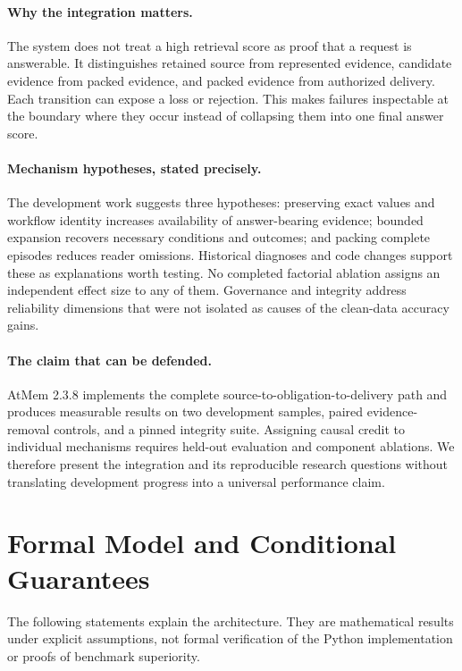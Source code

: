 \documentclass[11pt]{article}
\begin{document}
\paragraph{Why the integration matters.}
The system does not treat a high retrieval score as proof that a request is answerable. It distinguishes retained source from represented evidence, candidate evidence from packed evidence, and packed evidence from authorized delivery. Each transition can expose a loss or rejection. This makes failures inspectable at the boundary where they occur instead of collapsing them into one final answer score.

\paragraph{Mechanism hypotheses, stated precisely.}
The development work suggests three hypotheses: preserving exact values and workflow identity increases availability of answer-bearing evidence; bounded expansion recovers necessary conditions and outcomes; and packing complete episodes reduces reader omissions. Historical diagnoses and code changes support these as explanations worth testing. No completed factorial ablation assigns an independent effect size to any of them. Governance and integrity address reliability dimensions that were not isolated as causes of the clean-data accuracy gains.

\paragraph{The claim that can be defended.}
AtMem 2.3.8 implements the complete source-to-obligation-to-delivery path and produces measurable results on two development samples, paired evidence-removal controls, and a pinned integrity suite. Assigning causal credit to individual mechanisms requires held-out evaluation and component ablations. We therefore present the integration and its reproducible research questions without translating development progress into a universal performance claim.

\section{Formal Model and Conditional Guarantees}
\label{sec:formal}
The following statements explain the architecture. They are mathematical results under explicit assumptions, not formal verification of the Python implementation or proofs of benchmark superiority.
\end{document}
